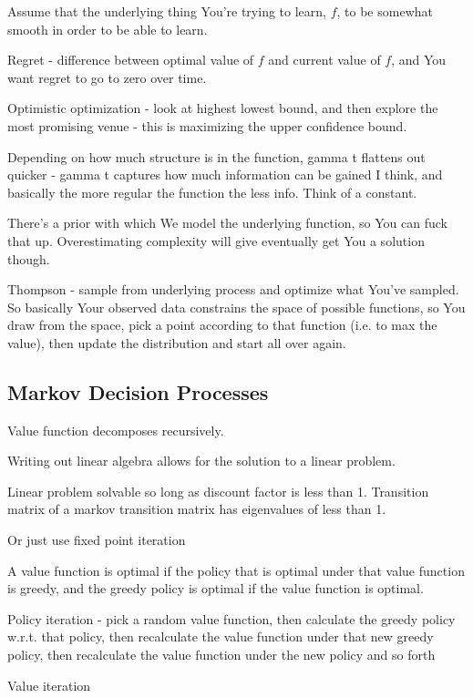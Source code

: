 \documentclass{article}
\begin{document}
			Assume that the underlying thing You're trying to learn, $f$, to be somewhat smooth in order to be able to learn.
			
			Regret - difference between optimal value of $f$ and current value of $f$, and You want regret to go to zero over time.
			
			Optimistic optimization - look at highest lowest bound, and then explore the most promising venue - this is maximizing the upper confidence bound.
			
			Depending on how much structure is in the function, gamma t flattens out quicker - gamma t captures how much information can be gained I think, and basically the more regular the function the less info. Think of a constant.
			
			There's a prior with which We model the underlying function, so You can fuck that up. Overestimating complexity will give eventually get You a solution though.
			
			Thompson - sample from underlying process and optimize what You've sampled. So basically Your observed data constrains the space of possible functions, so You draw from the space, pick a point according to that function (i.e. to max the value), then update the distribution and start all over again.
			
	\subsection{Markov Decision Processes}
	
		Value function decomposes recursively.
		
		Writing out linear algebra allows for the solution to a linear problem.
		
		Linear problem solvable so long as discount factor is less than 1. Transition matrix of a markov transition matrix has eigenvalues of less than 1.
		
		Or just use fixed point iteration
	
		A value function is optimal if the policy that is optimal under that value function is greedy, and the greedy policy is optimal if the value function is optimal.
		
		Policy iteration - pick a random value function, then calculate the greedy policy w.r.t. that policy, then recalculate the value function under that new greedy policy, then recalculate the value function under the new policy and so forth
		
		Value iteration
		
\end{document}
